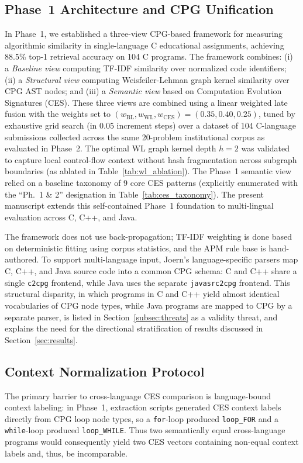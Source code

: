 \subsection{Phase~1 Architecture and CPG Unification}
\label{subsec:phase1_base}
In Phase~1, we established a three-view CPG-based framework for measuring algorithmic similarity in single-language C educational assignments, achieving 88.5\% top-1 retrieval accuracy on 104 C programs. The framework combines: (i) a \textit{Baseline view} computing TF-IDF similarity over normalized code identifiers; (ii) a \textit{Structural view} computing Weisfeiler-Lehman graph kernel similarity over CPG AST nodes; and (iii) a \textit{Semantic view} based on Computation Evolution Signatures (CES). These three views are combined using a linear weighted late fusion with the weights set to $(w_{\text{BL}}, w_{\text{WL}}, w_{\text{CES}}) = (0.35, 0.40, 0.25)$, tuned by exhaustive grid search (in 0.05 increment steps) over a dataset of 104 C-language submissions collected across the same 20-problem institutional corpus as evaluated in Phase~2. The optimal WL graph kernel depth $h=2$ was validated to capture local control-flow context without hash fragmentation across subgraph boundaries (as ablated in Table~\ref{tab:wl_ablation}). The Phase~1 semantic view relied on a baseline taxonomy of 9 core CES patterns (explicitly enumerated with the ``Ph.~1 \& 2'' designation in Table~\ref{tab:ces_taxonomy}). The present manuscript extends this self-contained Phase~1 foundation to multi-lingual evaluation across C, C++, and Java.

The framework does not use back-propagation; TF-IDF weighting is done based on deterministic fitting using corpus statistics, and the APM rule base is hand-authored. To support multi-language input, Joern's language-specific parsers map C, C++, and Java source code into a common CPG schema: C and C++ share a single \texttt{c2cpg} frontend, while Java uses the separate \texttt{javasrc2cpg} frontend. This structural disparity, in which programs in C and C++ yield almost identical vocabularies of CPG node types, while Java programs are mapped to CPG by a separate parser, is listed in Section~\ref{subsec:threats} as a validity threat, and explains the need for the directional stratification of results discussed in Section~\ref{sec:results}.

\subsection{Context Normalization Protocol}
\label{subsec:context_norm}
The primary barrier to cross-language CES comparison is language-bound context labeling: in Phase~1, extraction scripts generated CES context labels directly from CPG loop node types, so a \texttt{for}-loop produced \texttt{loop\_FOR} and a \texttt{while}-loop produced \texttt{loop\_WHILE}. Thus two semantically equal cross-language programs would consequently yield two CES vectors containing non-equal context labels and, thus, be incomparable.

